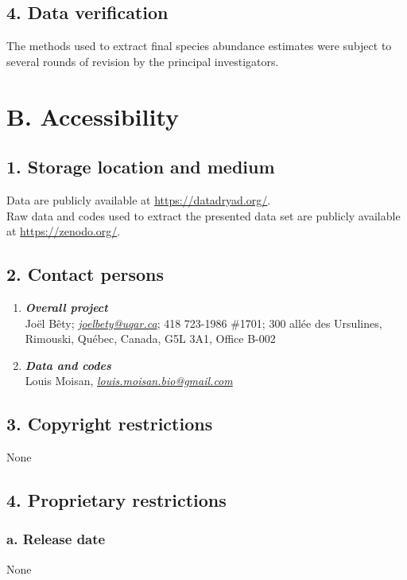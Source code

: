 \documentclass[a4paper,twoside,12pt]{article}
\begin{document}
        \subsection*{4. Data verification} The methods used to extract final species abundance estimates were subject to several rounds of revision by the principal investigators.

   \section*{B. Accessibility}
    		\subsection*{1. Storage location and medium}
Data are publicly available at \url{https://datadryad.org/}.\\[1.5em]
Raw data and codes used to extract the presented data set are publicly available at \url{https://zenodo.org/}.
    		 
        \subsection*{2. Contact persons}
        \begin{enumerate}[label=\alph*.]
      			\item[] \textit{\textbf{Overall project}}\\
      			Joël Bêty; \textit{\href{mailto:joel_bety@uqar.ca}{joel{\textunderscore}bety@uqar.ca}}; 418 723-1986 \#1701; 300 allée des Ursulines, Rimouski, Québec, Canada, G5L 3A1, Office B-002
      			\item[] \textit{\textbf{Data and codes}}\\
      			 Louis Moisan, \textit{\href{mailto:louis.moisan.bio@gmail.com}{louis.moisan.bio@gmail.com}}
      		\end{enumerate}



        	\subsection*{3. Copyright restrictions}
        	None
        	 
        	\subsection*{4. Proprietary restrictions}
        		\subsubsection*{a. Release date} None
\end{document}
